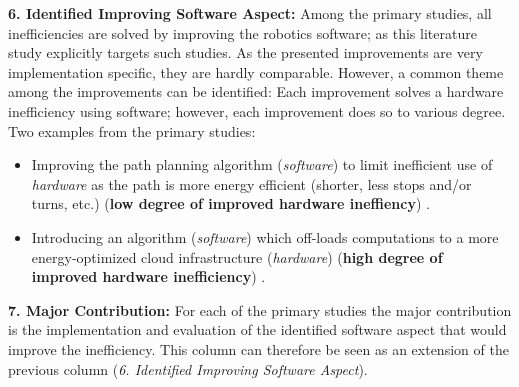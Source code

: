 \vspace{2mm}

\noindent\textbf{6. Identified Improving Software Aspect:}
Among the primary studies, all inefficiencies are solved by improving the robotics software;
as this literature study explicitly targets such studies.
As the presented improvements are very implementation specific, they are hardly comparable.
However, a common theme among the improvements can be identified:
Each improvement solves a hardware inefficiency using software; however, each improvement does so to various degree.
Two examples from the primary studies:

\begin{itemize}
    \item Improving the path planning algorithm (\textit{software}) to limit inefficient use of \textit{hardware} as the path
    is more energy efficient (shorter, less stops and/or turns, etc.) (\textbf{low degree of improved hardware ineffiency}) \cite{mei2006mobile_exploration}.
    \item Introducing an algorithm (\textit{software}) which off-loads computations to a more energy-optimized cloud infrastructure (\textit{hardware}) 
    (\textbf{high degree of improved hardware inefficiency}) \cite{rahman2019cloud_robot_offloading}.
\end{itemize}

\vspace{2mm}

\noindent\textbf{7. Major Contribution:}
For each of the primary studies the major contribution is the implementation and evaluation of the identified software aspect that would
improve the inefficiency. 
This column can therefore be seen as an extension of the previous column (\textit{6. Identified Improving Software Aspect}).

\vspace{2mm}

